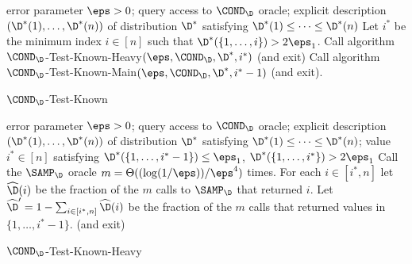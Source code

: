 \begin{algorithm}
\begin{algorithmic}[1]
\Require error parameter $\eps > 0$; query access to $\COND_\D$ oracle;
explicit description $(\D^\ast(1),\dots,\D^\ast(n))$ of distribution $\D^\ast$
satisfying $\D^\ast(1) \leq \cdots \leq \D^\ast(n)$
\State Let $i^\ast$ be the minimum index $i \in [n]$ such that
$\D^\ast(\{1,\dots,i\}) > 2 {\eps_1}$.
 \label{st:istar-exists}
  \State Call algorithm $\COND_\D$-Test-Known-Heavy$(\eps,
   \COND_\D, \D^\ast, i^\ast)$ (and exit)
\Else
  \State Call algorithm $\COND_\D$-Test-Known-Main$(\eps,
  \COND_\D, \D^\ast,i^\ast-1)$ (and exit).
\EndIf
\end{algorithmic}\caption{\label{algo:cond-test-known}\sc $\COND_\D$-Test-Known}
\end{algorithm}


\begin{algorithm}
\begin{algorithmic}[1]
\Require error parameter $\eps > 0$; query access to $\COND_\D$ oracle;
explicit description $(\D^\ast(1),\dots,\D^\ast(n))$ of distribution $\D^\ast$
satisfying $\D^\ast(1) \leq \cdots \leq \D^\ast(n)$;
value $i^\ast \in [n]$ satisfying
$\D^\ast(\{1,\dots,i^\ast-1\}) \leq {\eps_1}$, $\D^\ast(\{1,\dots,i^\ast\}) >
2 {\eps_1}$
\State \label{st:cond:heavy:sampling} Call the $\SAMP_\D$ oracle $m = \Theta((\log(1/\eps))/\eps^4)$
times.
For {each} ${i} \in [i^\ast,n]$ let $\widehat{\D}(i)$ be the fraction of the
$m$ calls to $\SAMP_\D$ that returned $i.$  {Let $\widehat{\D}'= 1 - \sum_{i \in [i^\ast,n]}
\widehat{\D}(i)$ be the fraction of the $m$ calls that returned values in $\{1,\dots,i^\ast-1\}.$}
    \State \Return \reject (and exit)
\EndIf
\State \Return \accept
\end{algorithmic}\caption{\label{algo:cond-test-known-heavy}\sc
$\COND_\D$-Test-Known-Heavy}
\end{algorithm}

